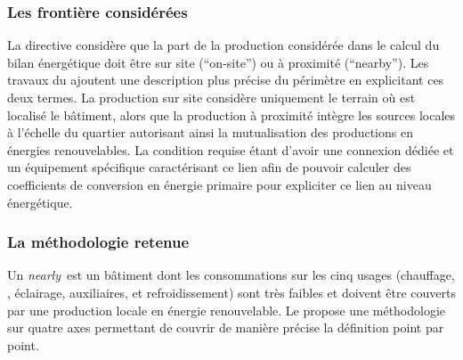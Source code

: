 \subsubsection{Les frontière considérées} %
\label{ssub:les_frontière_considérées}
La directive  considère que la part de la production considérée dans le
calcul du bilan énergétique doit être sur site
(\enquote{on-site}) ou à proximité (\enquote{nearby}). Les travaux du  ajoutent une
description plus précise du périmètre en explicitant ces deux termes. La production sur
site considère uniquement le terrain où est localisé le bâtiment, alors que la production
à proximité intègre les sources locales à l’échelle du quartier autorisant ainsi la mutualisation
des productions en énergies renouvelables. La condition requise étant d’avoir
une connexion dédiée et un équipement spécifique caractérisant ce lien afin de pouvoir
calculer des coefficients de conversion en énergie primaire pour expliciter ce lien au
niveau énergétique.



\subsubsection{La méthodologie retenue} %
\label{ssub:la_methodologie_retenue}
Un \textit{nearly}\, est un bâtiment dont les consommations sur les cinq usages
(chauffage, , éclairage, auxiliaires, et refroidissement)
sont très faibles et doivent être couverts par une production locale en énergie renouvelable.
Le  propose une méthodologie sur quatre axes permettant de couvrir de manière
précise la définition point par point.

